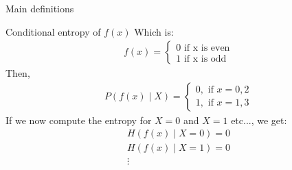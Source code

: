 \begin{parag}{Main definitions}
\begin{subparag}{Conditional entropy of $f(x)$}
       Which is:
       \begin{align*}
           f(x) = \begin{cases}
               0 \text{ if x is even} \\
               1 \text{ if x is odd}
           \end{cases}
       \end{align*}
      Then,
      \begin{align*}
          P(f(x) \mid X) = \begin{cases}
              0, \text{ if } x = 0, 2 \\
              1, \text{ if } x = 1, 3
          \end{cases}
      \end{align*}
      If we now compute the entropy for $X = 0$ and $X = 1$ etc...,  we get:
      \begin{align*}
          H(f(x) \mid  X = 0) = 0 \\
         H(f(x) \mid  X = 1) = 0 \\
         \vdots
      \end{align*}
   \end{subparag} 
\end{parag}

